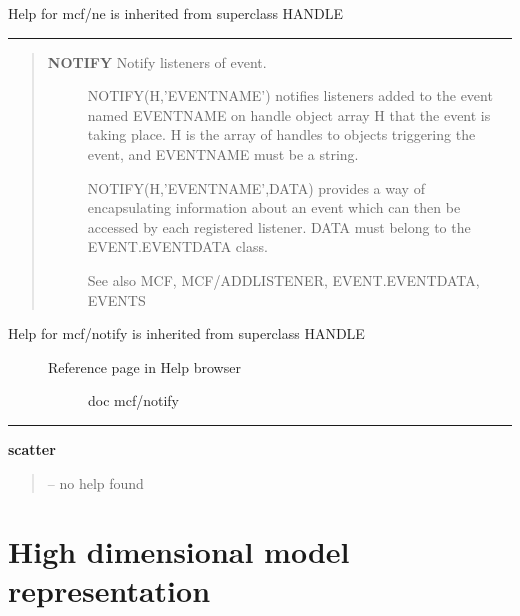 \documentclass[letterpaper,10pt,english]{sphinxmanual}
\begin{document}
Help for mcf/ne is inherited from superclass HANDLE


\bigskip\hrule{}\bigskip

\label{classes/utils/@mcf/mcf:notify}\begin{quote}
\begin{description}
\item[{\textbf{NOTIFY}   Notify listeners of event.}] \leavevmode
NOTIFY(H,'EVENTNAME') notifies listeners added to the event named
EVENTNAME on handle object array H that the event is taking place.
H is the array of handles to objects triggering the event, and
EVENTNAME must be a string.

NOTIFY(H,'EVENTNAME',DATA) provides a way of encapsulating information
about an event which can then be accessed by each registered listener.
DATA must belong to the EVENT.EVENTDATA class.

See also MCF, MCF/ADDLISTENER, EVENT.EVENTDATA, EVENTS

\end{description}
\end{quote}
\begin{description}
\item[{Help for mcf/notify is inherited from superclass HANDLE}] \leavevmode\begin{description}
\item[{Reference page in Help browser}] \leavevmode
doc mcf/notify

\end{description}

\end{description}


\bigskip\hrule{}\bigskip

\label{classes/utils/@mcf/mcf:scatter}
\textbf{scatter}
\begin{quote}

-- no help found
\end{quote}


\chapter{High dimensional model representation}
\label{classes/utils/@hdmr/hdmr::doc}\label{classes/utils/@hdmr/hdmr:high-dimensional-model-representation}
\end{document}
